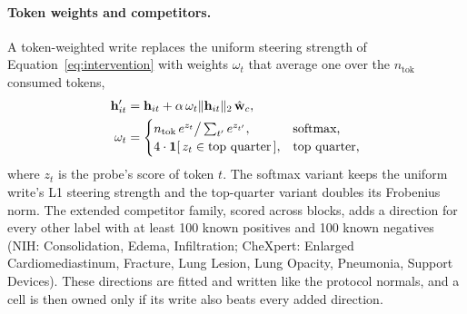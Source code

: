 \documentclass[11pt]{article}
\begin{document}
\paragraph{Token weights and competitors.} A token-weighted write replaces the uniform steering strength of Equation~\ref{eq:intervention} with weights $\omega_t$ that average one over the $n_{\mathrm{tok}}$ consumed tokens,
\begin{equation}
\begin{aligned}
\mathbf{h}'_{it}&=\mathbf{h}_{it}+\alpha\,\omega_t\lVert\mathbf{h}_{it}\rVert_2\,\hat{\mathbf{w}}_c,\\
\omega_t&=\begin{cases}
n_{\mathrm{tok}}\,e^{z_t}\big/\sum_{t'}e^{z_{t'}}, & \text{softmax,}\\
4\cdot\mathbf 1[\,z_t\in\text{top quarter}\,], & \text{top quarter,}
\end{cases}
\end{aligned}
\label{eq:token-weights}
\end{equation}
where $z_t$ is the probe's score of token $t$. The softmax variant keeps the uniform write's L1 steering strength and the top-quarter variant doubles its Frobenius norm. The extended competitor family, scored across \cfExtcompBlocks{} blocks, adds a direction for every other label with at least 100 known positives and 100 known negatives (NIH: Consolidation, Edema, Infiltration; CheXpert: Enlarged Cardiomediastinum, Fracture, Lung Lesion, Lung Opacity, Pneumonia, Support Devices). These directions are fitted and written like the protocol normals, and a cell is then owned only if its write also beats every added direction.
\end{document}
